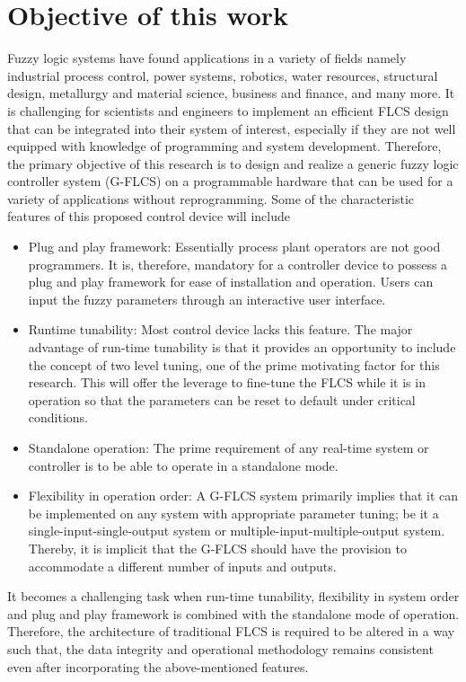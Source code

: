 \section{Objective of this work} \label{sec:obj}
Fuzzy logic systems have found applications in a variety of fields namely industrial process control, power systems, robotics, water resources, structural design, metallurgy and material science, business and finance, and many more. It is challenging for scientists and engineers to implement an efficient FLCS design that can be integrated into their system of interest, especially if they are not well equipped with knowledge of programming and system development. Therefore, the primary objective of this research is to design and realize a generic fuzzy logic controller system (G\hyp{}FLCS) on a programmable hardware that can be used for a variety of applications without reprogramming. Some of the characteristic features of this proposed control device will include
\begin{itemize}
	\item Plug and play framework: Essentially process plant operators are not good programmers. It is, therefore, mandatory for a controller device to possess a plug and play framework for ease of installation and operation. Users can input the fuzzy parameters through an interactive user interface.
	\item Runtime tunability: Most control device lacks this feature. The major advantage of run\hyp{}time tunability is that it provides an opportunity to include the concept of two level tuning, one of the prime motivating factor for this research. This will offer the leverage to fine-tune the FLCS while it is in operation so that the parameters can be reset to default under critical conditions.
	\item Standalone operation: The prime requirement of any real\hyp{}time system or controller is to be able to operate in a standalone mode.
	\item Flexibility in operation order: A G\hyp{}FLCS system primarily implies that it can be implemented on any system with appropriate parameter tuning; be it a single\hyp{}input\hyp{}single\hyp{}output system or multiple\hyp{}input\hyp{}multiple\hyp{}output system. Thereby, it is implicit that the G\hyp{}FLCS should have the provision to accommodate a different number of inputs and outputs.
\end{itemize}
It becomes a challenging task when run\hyp{}time tunability, flexibility in system order and plug and play framework is combined with the standalone mode of operation. Therefore, the architecture of traditional FLCS is required to be altered in a way such that, the data integrity and operational methodology remains consistent even after incorporating the above-mentioned features.

